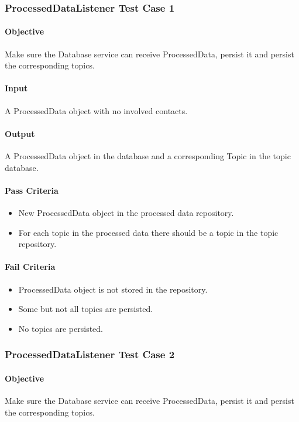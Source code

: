 \documentclass[hidelinks,english]{article}
\begin{document}
			\subsubsection{ProcessedDataListener Test Case 1}\label{databaseprocesseddatalistenertest1}
				\paragraph{Objective} Make sure the Database service can receive ProcessedData, persist it and persist the corresponding topics.
				\paragraph{Input} A ProcessedData object with no involved contacts.
				\paragraph{Output} A ProcessedData object in the database and a corresponding Topic in the topic database.
				\paragraph{Pass Criteria}
				\begin{itemize}
					\item New ProcessedData object in the processed data repository.
					\item For each topic in the processed data there should be a topic in the topic repository.
				\end{itemize}
				\paragraph{Fail Criteria}
				\begin{itemize}
					\item ProcessedData object is not stored in the repository.
					\item Some but not all topics are persisted.
					\item No topics are persisted.
				\end{itemize}
				
			\subsubsection{ProcessedDataListener Test Case 2}\label{databaseprocesseddatalistenertest2}
				\paragraph{Objective} Make sure the Database service can receive ProcessedData, persist it and persist the corresponding topics.
\end{document}
